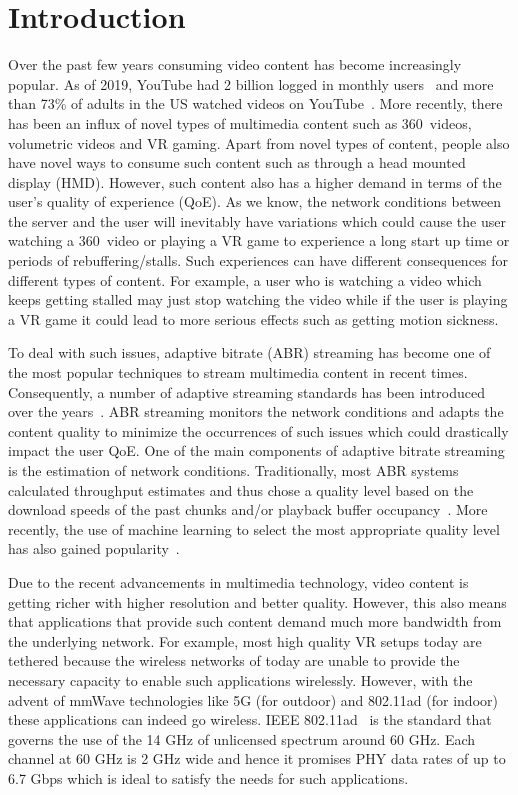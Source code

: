 \documentclass[sigconf,anonymous]{acmart}
\begin{document}
\graphicspath{{figs/}}

\section{Introduction} %

Over the past few years consuming video content has become increasingly popular. As of 2019, YouTube had 2 billion logged in monthly users~\cite{statista} and more than 73\% of adults in the US watched videos on YouTube~\cite{pew-research}. More recently, there has been an influx of novel types of multimedia content such as 360\degree~videos, volumetric videos and VR gaming. Apart from novel types of content, people also have novel ways to consume such content such as through a head mounted display (HMD). However, such content also has a higher demand in terms of the user's quality of experience (QoE). As we know, the network conditions between the server and the user will inevitably have variations which could cause the user watching a 360\degree~video or playing a VR game to experience a long start up time or periods of rebuffering/stalls. Such experiences can have different consequences for different types of content. For example, a user who is watching a video which keeps getting stalled may just stop watching the video while if the user is playing a VR game it could lead to more serious effects such as getting motion sickness.

To deal with such issues, adaptive bitrate (ABR) streaming has become one of the most popular techniques to stream multimedia content in recent times. Consequently, a number of adaptive streaming standards has been introduced over the years~\cite{stockhammer:mmsys2011, pantos-hls, adobe-hds, microsoft-ss}. ABR streaming monitors the network conditions and adapts the content quality to minimize the occurrences of such issues which could drastically impact the user QoE. One of the main components of adaptive bitrate streaming is the estimation of network conditions. Traditionally, most ABR systems calculated throughput estimates and thus chose a quality level based on the download speeds of the past chunks and/or playback buffer occupancy~\cite{sun:sigcomm2016, spiteri:infocom2016}. More recently, the use of machine learning to select the most appropriate quality level has also gained popularity~\cite{mao:sigcomm2017, yan:nsdi2020}.

Due to the recent advancements in multimedia technology, video content is getting richer with higher resolution and better quality. However, this also means that applications that provide such content demand much more bandwidth from the underlying network. For example, most high quality VR setups today are tethered because the wireless networks of today are unable to provide the necessary capacity to enable such applications wirelessly. However, with the advent of mmWave technologies like 5G (for outdoor) and 802.11ad (for indoor) these applications can indeed go wireless. IEEE 802.11ad~\cite{80211ad} is the standard that governs the use of the 14 GHz of unlicensed spectrum around 60 GHz. Each channel at 60 GHz is 2 GHz wide and hence it promises PHY data rates of up to 6.7 Gbps which is ideal to satisfy the needs for such applications.
\end{document}
